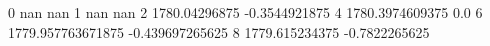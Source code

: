 0 nan nan
1 nan nan
2 1780.04296875 -0.3544921875
4 1780.3974609375 0.0
6 1779.957763671875 -0.439697265625
8 1779.615234375 -0.7822265625
